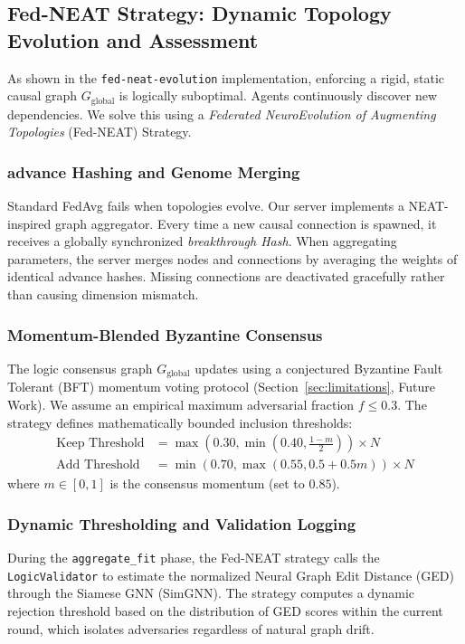 \documentclass[journal]{IEEEtran}
\begin{document}
\subsection{Fed-NEAT Strategy: Dynamic Topology Evolution and Assessment}

As shown in the \texttt{fed-neat-evolution} implementation, enforcing a rigid, static causal graph $G_{\text{global}}$ is logically suboptimal. Agents continuously discover new dependencies. We solve this using a \emph{Federated NeuroEvolution of Augmenting Topologies} (Fed-NEAT) Strategy.

\subsubsection{advance Hashing and Genome Merging}
Standard FedAvg fails when topologies evolve. Our server implements a NEAT-inspired graph aggregator. Every time a new causal connection is spawned, it receives a globally synchronized \emph{breakthrough Hash}. When aggregating parameters, the server merges nodes and connections by averaging the weights of identical advance hashes. Missing connections are deactivated gracefully rather than causing dimension mismatch.

\subsubsection{Momentum-Blended Byzantine Consensus}
The logic consensus graph $G_{\text{global}}$ updates using a conjectured Byzantine Fault Tolerant (BFT) momentum voting protocol (Section~\ref{sec:limitations}, Future Work). We assume an empirical maximum adversarial fraction $f \le 0.3$. The strategy defines mathematically bounded inclusion thresholds:
\begin{align}
\text{Keep Threshold} &= \max\left(0.30, \min\left(0.40, \frac{1 - m}{2}\right)\right) \times N \\
\text{Add Threshold} &= \min\left(0.70, \max\left(0.55, 0.5 + 0.5m\right)\right) \times N
\end{align}
where $m \in [0, 1]$ is the consensus momentum (set to $0.85$). 

\subsubsection{Dynamic Thresholding and Validation Logging}
During the \texttt{aggregate\_fit} phase, the Fed-NEAT strategy calls the \texttt{LogicValidator} to estimate the normalized Neural Graph Edit Distance (GED) through the Siamese GNN (SimGNN). The strategy computes a dynamic rejection threshold based on the distribution of GED scores within the current round, which isolates adversaries regardless of natural graph drift.
\end{document}

